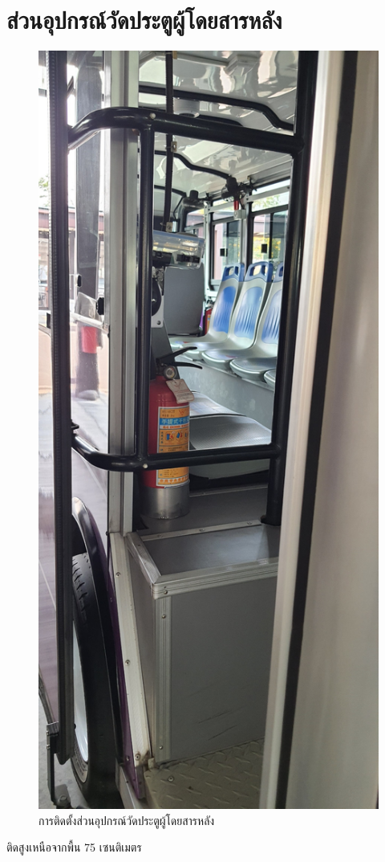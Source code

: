 \section{ส่วนอุปกรณ์วัดประตูผู้โดยสารหลัง}
    \begin{figure}[h!]
        \begin{center}
        \includegraphics[width=\textwidth,angle=-90,origin=c]{install_back.jpg}
        \end{center}
        \caption{การติดตั้งส่วนอุปกรณ์วัดประตูผู้โดยสารหลัง}
        \label{fig:install_back}
    \end{figure}
    ติดสูงเหนือจากพื้น 75 เซนติเมตร

